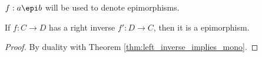 \begin{remark}
  $f:a\epi b$ will be used to denote epimorphisms.
\end{remark}

\begin{theorem}\label{thm:right_inverse_implies_epi}
  If $f:C\to D$ has a right inverse $f':D\to C$, then it is a epimorphism.

  \begin{proof}
    By duality with Theorem \ref{thm:left_inverse_implies_mono}.
  \end{proof}
\end{theorem}